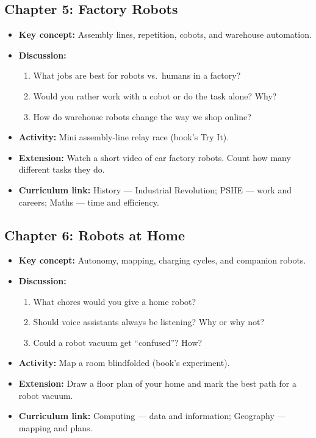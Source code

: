 \subsection*{Chapter 5: Factory Robots}
\begin{itemize}
  \item \textbf{Key concept:} Assembly lines, repetition, cobots, and warehouse automation.
  \item \textbf{Discussion:}
    \begin{enumerate}
      \item What jobs are best for robots vs.\ humans in a factory?
      \item Would you rather work with a cobot or do the task alone? Why?
      \item How do warehouse robots change the way we shop online?
    \end{enumerate}
  \item \textbf{Activity:} Mini assembly-line relay race (book's Try It).
  \item \textbf{Extension:} Watch a short video of car factory robots. Count how many different tasks they do.
  \item \textbf{Curriculum link:} History --- Industrial Revolution; PSHE --- work and careers; Maths --- time and efficiency.
\end{itemize}

\subsection*{Chapter 6: Robots at Home}
\begin{itemize}
  \item \textbf{Key concept:} Autonomy, mapping, charging cycles, and companion robots.
  \item \textbf{Discussion:}
    \begin{enumerate}
      \item What chores would you give a home robot?
      \item Should voice assistants always be listening? Why or why not?
      \item Could a robot vacuum get ``confused''? How?
    \end{enumerate}
  \item \textbf{Activity:} Map a room blindfolded (book's experiment).
  \item \textbf{Extension:} Draw a floor plan of your home and mark the best path for a robot vacuum.
  \item \textbf{Curriculum link:} Computing --- data and information; Geography --- mapping and plans.
\end{itemize}

